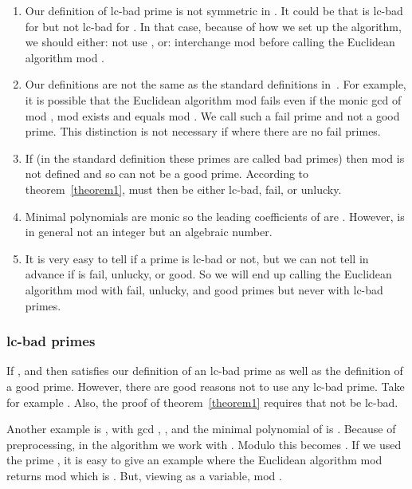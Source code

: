 \documentclass[10pt]{article}
\newcommand{\bad}{lc-bad }
\newcommand{\bbad}{lc-bad}
\begin{document}
\begin{enumerate}
\item Our definition of \bad prime is not symmetric in .
It could be that  is \bad for  but not \bad for .
In that case, because of how we set up the algorithm,
we should either: not use , or: interchange
 mod  before calling the Euclidean algorithm mod .


\item Our definitions are not the same as the
standard definitions in~\cite{Brown}.
For example, it is possible that the Euclidean algorithm mod  fails
even if the monic gcd of  mod ,  mod  exists
and equals  mod .
We call such  a fail prime and not a good prime.
This distinction is not necessary if 
where there are no fail primes.



\item If 
(in the standard definition these primes are called bad primes)
then  mod  is not defined and so
 can not be a good prime.
According to theorem~\ref{theorem1},  must then be either
\bbad, fail, or unlucky.



\item Minimal polynomials are monic so
the leading coefficients of  are
.
However,  is in general not an integer but
an algebraic number.


\item 
It is very easy to tell if a prime  is \bad or not, but we can
not tell in advance if  is fail, unlucky, or good.
So we will end up calling the Euclidean algorithm mod  with fail, unlucky,
and good primes but never with \bad primes.
\end{enumerate}

\subsubsection{\bad primes}
If ,  and  then  satisfies
our definition of an \bad prime as well as the definition of a good
prime. However, there are good reasons not to use any \bad prime.
Take for example .
Also, the proof of theorem~\ref{theorem1}
requires that  not be \bbad.


Another example is ,  with
gcd ,
, and the minimal polynomial of  is
.
Because of preprocessing, in the algorithm we work with
. Modulo  this becomes
. If we used the prime , it is easy to give an example 
where the Euclidean algorithm mod  returns  mod 
which is . But, viewing  as a variable,
 mod .
\end{document}
